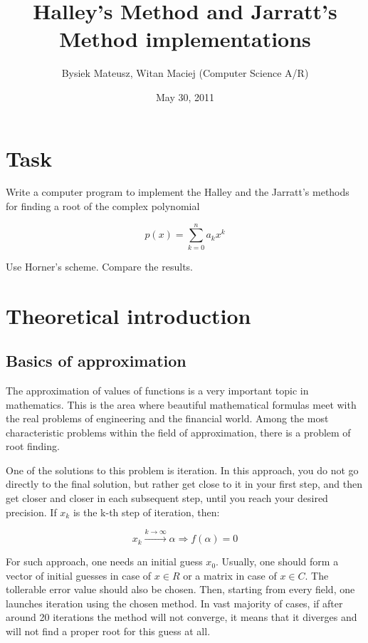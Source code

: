 \documentclass{article}
\begin{document}
\title{Halley's Method and Jarratt's Method implementations}
\date{May 30, 2011}
\author{Bysiek Mateusz, Witan Maciej (Computer Science A/R)}
\maketitle

\section{Task}

Write a computer program to implement the Halley and the Jarratt's methods for
finding a root of the complex polynomial

\[ p(x) = \sum_{k=0}^{n}{a_k x^k}  \]

Use Horner's scheme. Compare the results.

\section{Theoretical introduction}

\subsection{Basics of approximation}

The approximation of values of functions is a very important topic in mathematics. This is the area
where beautiful mathematical formulas meet with the real problems of engineering and the financial
world. Among the most characteristic problems within the field of approximation, there is a problem
of root finding.

One of the solutions to this problem is iteration. In this approach, you do not go directly to the
final solution, but rather get close to it in your first step, and then get closer and closer in
each subsequent step, until you reach your desired precision. If $x_k$ is the k-th step of
iteration, then:

\[ x_k \stackrel{k \rightarrow \infty}{\longrightarrow} \alpha \Longrightarrow f(\alpha) = 0 \]

For such approach, one needs an initial guess $x_0$. Usually, one should form a vector of initial
guesses in case of $x \in R$ or a matrix in case of $x \in C$. The tollerable error value should
also be chosen. Then, starting from every field, one launches iteration using the chosen method. In
vast majority of cases, if after around 20 iterations the method will not converge, it means that it
diverges and will not find a proper root for this guess at all.
\end{document}
